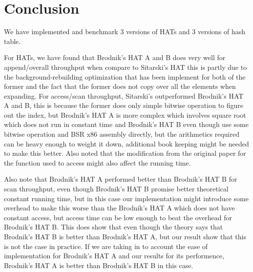 \documentclass{article} %
\begin{document}
    \section*{Conclusion}
    We have implemented and benchmark 3 versions of HATs and 3 versions of hash table.
    
    For HATs, we have found that Brodnik's HAT A and B does very well for append/overall throughput when compare to Sitarski's HAT this is partly due to
    the background-rebuilding optimization that has been implement for both of the former and the fact that the former does not copy over all the elements
    when expanding. For access/scan throughput, Sitarski's outperformed Brodnik's HAT A and B, this is because the former does only simple bitwise operation to figure out the index,
    but Brodnik's HAT A is more complex which involves square root which does not run in constant time and Brodnik's HAT B even though use some bitwise operation and BSR x86 assembly directly, but
    the arithmetics required can be heavy enough to weight it down, additional book keeping might be needed to make this better. Also noted that the modification from
    the original paper for the function used to access might also affect the running time.

    Also note that Brodnik's HAT A performed better than Brodnik's HAT B for scan throughput, even though Brodnik's HAT B promise better theoretical constant running time, but in this
    case our implementation might introduce some overhead to make this worse than the Brodnik's HAT A which does not have constant access, but access time can be low enough to beat the overhead for
    Brodnik's HAT B. This does show that even though the theory says that Brodnik's HAT B is better than Brodnik's HAT A, but our result show that this is not the case in practice.
    If we are taking in to account the ease of implementation for Brodnik's HAT A and our results for its performence, Brodnik's HAT A is better than Brodnik's HAT B in this case.
\end{document}
